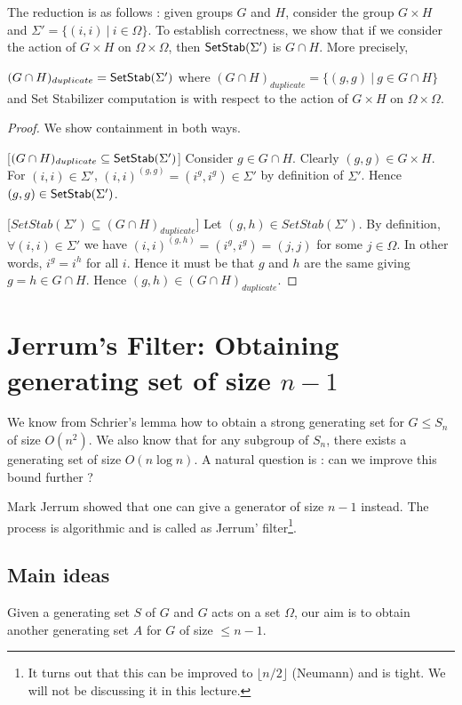 The reduction is as follows : given groups $G$ and $H$, consider the group $G
\times H$  and $\Sigma'=\{ (i,i)~|~ i \in \Omega \}$. To establish correctness,
we show that if we consider the action of $G \times H$ on $\Omega \times
\Omega$, then ${\sf SetStab}(\Sigma')$ is $G \cap H$. More precisely,
\begin{claim}
$(G \cap H)_{duplicate} = {\sf SetStab}(\Sigma')$ where $(G \cap H)_{duplicate} = \{
(g,g) ~|~ g\in G \cap H \}$ and Set Stabilizer computation is with respect to
the action of $G \times H$ on $\Omega \times \Omega$.
\end{claim}
\begin{proof} We show containment in both ways.

	 [$(G \cap H)_{duplicate} \subseteq
	{\sf SetStab}(\Sigma')$] Consider $g \in G \cap H$.  Clearly
	$(g,g) \in G \times H$.  For $(i,i) \in \Sigma'$,
	$(i,i)^{(g,g)} = (i^g, i^g) \in \Sigma'$ by definition of
	$\Sigma'$. Hence $(g,g) \in {\sf SetStab}(\Sigma')$.
	
	[$SetStab(\Sigma') \subseteq (G \cap H)_{duplicate}$]
	Let $(g,h) \in SetStab(\Sigma')$. By definition, $\forall
	(i,i) \in \Sigma'$ we have $(i,i)^{(g,h)} = (i^g,i^g) =(j,j)$
	for some $j \in \Omega$. In other words, $i^g = i^h$ for all
	$i$. Hence it must be that $g$ and $h$ are the same giving 
	$g= h  \in G \cap H$. Hence $(g,h) \in (G \cap
	H)_{duplicate}$.
\end{proof}
	
\section{Jerrum's Filter: Obtaining generating set of size $n-1$}
We know from Schrier's lemma how to obtain a strong generating set for $G \le
S_n$ of size $O(n^2)$. We also know that for any subgroup of $S_n$, there
exists a generating set of size $O(n\log n)$. A natural question is : can we
improve this bound further ?

Mark Jerrum showed that one can give a generator of size $n-1$ instead. The
process is algorithmic and is called as Jerrum' filter\footnote{It turns out
	that this can be improved to $\lfloor n/2 \rfloor$ (Neumann) and is
	tight.  We will not be discussing it in this lecture.}.

\subsection{Main ideas}
Given a generating set $S$ of $G$ and $G$ acts on a set $\Omega$, our aim is 
to obtain another generating set $A$ for $G$ of size $\le n-1$.

